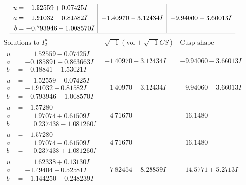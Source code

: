 \documentclass[1p]{elsarticle_modified}
\theoremstyle{definition}
\newcommand{\I}{\sqrt{-1}}
\begin{document}
$$\begin{array}{c|c|c}
\begin{aligned}
u &= \phantom{-}1.52559 + 0.07425 I \\
a &= -1.91032 - 0.81582 I \\
b &= -0.793946 - 1.008570 I\end{aligned}
 & -1.40970 - 3.12434 I & -9.94060 + 3.66013 I\\
 \hline 
 \end{array}$$\newpage$$\begin{array}{c|c|c}  
\text{Solutions to }I^u_{2}& \I (\text{vol} + \sqrt{-1}CS) & \text{Cusp shape}\\
 \hline 
\begin{aligned}
u &= \phantom{-}1.52559 - 0.07425 I \\
a &= -0.185891 - 0.863663 I \\
b &= -0.18841 - 1.53021 I\end{aligned}
 & -1.40970 + 3.12434 I & -9.94060 - 3.66013 I \\ \hline\begin{aligned}
u &= \phantom{-}1.52559 - 0.07425 I \\
a &= -1.91032 + 0.81582 I \\
b &= -0.793946 + 1.008570 I\end{aligned}
 & -1.40970 + 3.12434 I & -9.94060 - 3.66013 I \\ \hline\begin{aligned}
u &= -1.57280\phantom{ +0.000000I} \\
a &= \phantom{-}1.97074 + 0.61509 I \\
b &= \phantom{-}0.237438 - 1.081260 I\end{aligned}
 & -4.71670\phantom{ +0.000000I} & -16.1480\phantom{ +0.000000I} \\ \hline\begin{aligned}
u &= -1.57280\phantom{ +0.000000I} \\
a &= \phantom{-}1.97074 - 0.61509 I \\
b &= \phantom{-}0.237438 + 1.081260 I\end{aligned}
 & -4.71670\phantom{ +0.000000I} & -16.1480\phantom{ +0.000000I} \\ \hline\begin{aligned}
u &= \phantom{-}1.62338 + 0.13130 I \\
a &= -1.49404 + 0.52581 I \\
b &= -1.144250 + 0.248239 I\end{aligned}
 & -7.82454 - 8.28859 I & -14.5771 + 5.2713 I \\ \hline\begin{aligned}

\end{aligned}
\end{array}$$
\end{document}
